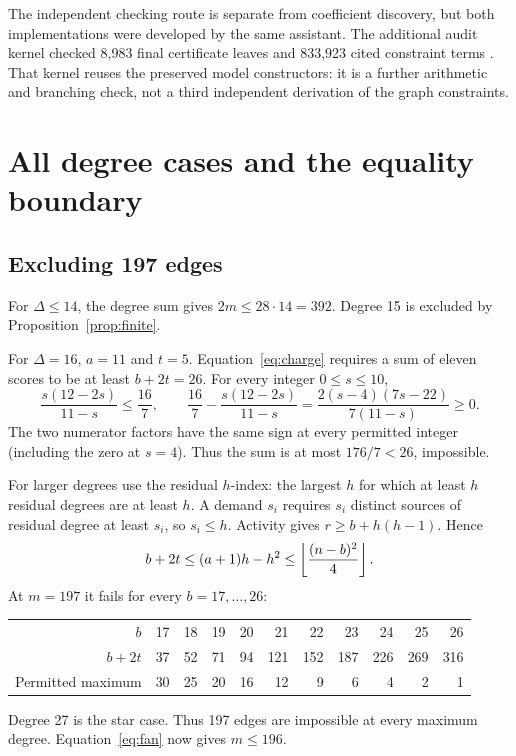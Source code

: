 \documentclass[11pt,a4paper]{article}
\begin{document}
The independent checking route is separate from coefficient discovery, but both implementations were developed by the same assistant. The additional audit kernel checked 8,983 final certificate leaves and 833,923 cited constraint terms \cite{audit}. That kernel reuses the preserved model constructors: it is a further arithmetic and branching check, not a third independent derivation of the graph constraints.

\section{All degree cases and the equality boundary}\label{sec:assembly}
\subsection{Excluding 197 edges}
For $\Delta\le14$, the degree sum gives $2m\le28\cdot14=392$. Degree 15 is excluded by Proposition~\ref{prop:finite}.

For $\Delta=16$, $a=11$ and $t=5$. Equation~\eqref{eq:charge} requires a sum of eleven scores to be at least $b+2t=26$. For every integer $0\le s\le10$,
\[
 \frac{s(12-2s)}{11-s}\le\frac{16}{7},\qquad
 \frac{16}{7}-\frac{s(12-2s)}{11-s}
 =\frac{2(s-4)(7s-22)}{7(11-s)}\ge0.
\]
The two numerator factors have the same sign at every permitted integer (including the zero at $s=4$). Thus the sum is at most $176/7<26$, impossible.

For larger degrees use the residual $h$-index: the largest $h$ for which at least $h$ residual degrees are at least $h$. A demand $s_i$ requires $s_i$ distinct sources of residual degree at least $s_i$, so $s_i\le h$. Activity gives $r\ge b+h(h-1)$. Hence
\begin{equation}\label{eq:hindex}
 b+2t\le(a+1)h-h^2\le\left\lfloor\frac{(n-b)^2}{4}\right\rfloor.
\end{equation}
At $m=197$ it fails for every $b=17,\ldots,26$:
\begin{center}\begin{tabular}{rrrrrrrrrrr}\toprule
$b$&17&18&19&20&21&22&23&24&25&26\\
$b+2t$&37&52&71&94&121&152&187&226&269&316\\
Permitted maximum&30&25&20&16&12&9&6&4&2&1\\\bottomrule
\end{tabular}\end{center}
Degree 27 is the star case. Thus 197 edges are impossible at every maximum degree. Equation~\eqref{eq:fan} now gives $m\le196$.
\end{document}
